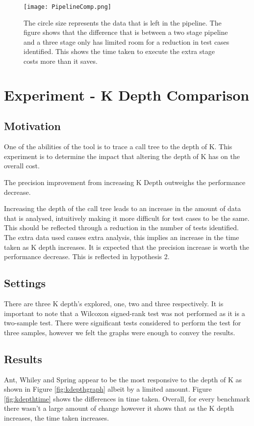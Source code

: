 \begin{figure}[h]
\centering
\texttt{[image: PipelineComp.png]}
\caption{The circle size represents the data that is left in the pipeline. The figure shows that the difference that is between a two stage pipeline and a three stage only has limited room for a reduction in test cases identified. This shows the time taken to execute the extra stage costs more than it saves.}
\label{fig:pipelinecomp}
\end{figure}

\section{Experiment  - K Depth Comparison}
\label{kdepthcomp}
\subsection{Motivation}
One of the abilities of the tool is to trace a call tree to the depth of K. This experiment is to determine the impact that altering the depth of K has on the overall cost. 

\begin{hyp}
The precision improvement from increasing K Depth outweighs the performance decrease.
\end{hyp}

Increasing the depth of the call tree leads to an increase in the amount of data that is analysed, intuitively making it more difficult for test cases to be the same. This should be reflected through a reduction in the number of tests identified. The extra data used causes extra analysis, this implies an increase in the time taken as K depth increases. It is expected that the precision increase is worth the performance decrease. This is reflected in hypothesis 2.

\subsection{Settings}
There are three K depth's explored, one, two and three respectively. It is important to note that a Wilcoxon signed-rank test was not performed as it is a two-sample test. There were significant tests considered to perform the test for three samples, however we felt the graphs were enough to convey the results.


\subsection{Results}
Ant, Whiley and Spring appear to be the most responsive to the depth of K as shown in Figure \ref{fig:kdepthgraph} albeit by a limited amount. Figure \ref{fig:kdepthtime} shows the differences in time taken. Overall, for every benchmark there wasn't a large amount of change however it shows that as the K depth increases, the time taken increases.

